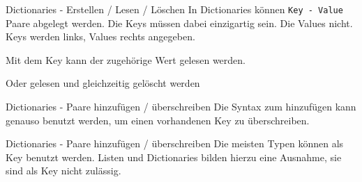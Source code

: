 \begin{frame}{Dictionaries - Erstellen / Lesen / Löschen}
	In Dictionaries können \alert{\texttt{Key - Value}} Paare abgelegt werden.
	\linebreak
	Die Keys müssen dabei einzigartig sein. Die Values nicht.
	\linebreak
	Keys werden links, Values rechts angegeben.
	
	\pause
	Mit dem Key kann der zugehörige Wert gelesen werden.
	
	Oder gelesen und gleichzeitig gelöscht werden
	
	
\end{frame}

\begin{frame}{Dictionaries - Paare hinzufügen / überschreiben}
	Die Syntax zum hinzufügen kann genauso benutzt werden, um einen vorhandenen Key zu überschreiben.
	
	
\end{frame}

\begin{frame}{Dictionaries - Paare hinzufügen / überschreiben}
	Die meisten Typen können als Key benutzt werden. Listen und Dictionaries bilden hierzu eine Ausnahme, sie sind als Key nicht zulässig.
	
\end{frame}


